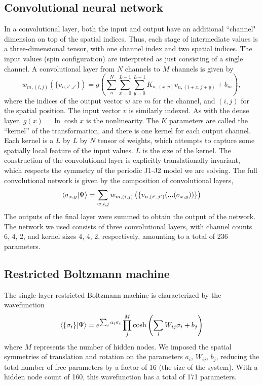 \documentclass[amsmath,amssymb,aps,prb,superscriptaddress,onecolumn,floatfix]{revtex4}
\begin{document}
\subsection{Convolutional neural network}
In a convolutional layer, both the input and output have an additional ``channel" dimension on top of the spatial indices.
Thus, each stage of intermediate values is a three-dimensional tensor, with one channel index and two spatial indices.
The input values (spin configuration) are interpreted as just consisting of a single channel.
A convolutional layer from $N$ channels to $M$ channels is given by
\begin{equation}
    w_{m,(i,j)}(\{v_{n,i',j'}\}) = g\left(\sum_{n}^N \sum_{x=0}^{L-1} \sum_{y=0}^{L-1} K_{n,(x,y)} v_{n,(i+x,j+y)} + b_m\right),
\end{equation}
where the indices of the output vector $w$ are $m$ for the channel, and $(i, j)$ for the spatial position.
The input vector $v$ is similarly indexed.
As with the dense layer, $g(x) = \ln{\cosh{x}}$ is the nonlinearity.
The $K$ parameters are called the ``kernel'' of the transformation, and there is one kernel for each output channel.
Each kernel is a $L$ by $L$ by $N$ tensor of weights, which attempts to capture some spatially local feature of the input values.
$L$ is the size of the kernel.
The construction of the convolutional layer is explicitly translationally invariant, which respects the symmetry of the periodic J1-J2 model we are solving.
The full convolutional network is given by the composition of convolutional layers,
\begin{equation}
    \bra{\sigma_{x, y}}\ket{\Psi} = \sum_{w,i,j} w_{m,(i,j)}\left(\{v_{n,(i',j')}(...(\sigma_{x,y}))\}\right)
\end{equation}
The outputs of the final layer were summed to obtain the output of the network.
The network we used consists of three convolutional layers, with channel counts 6, 4, 2, and kernel sizes 4, 4, 2, respectively, amounting to a total of 236 parameters.

\subsection{Restricted Boltzmann machine}
The single-layer restricted Boltzmann machine is characterized by the wavefunction
\begin{equation}
    \bra{\{ \sigma_i \}}\ket{\Psi} = e^{\sum_i a_i \sigma_i} \prod_j^M \cosh \left(\sum_i W_{ij} \sigma_i + b_j \right)
\end{equation}
where $M$ represents the number of hidden nodes.
We imposed the spatial symmetries of translation and rotation on the parameters $a_i$, $W_{ij}$, $b_j$, reducing the total number of free parameters by a factor of 16 (the size of the system).
With a hidden node count of 160, this wavefunction has a total of 171 parameters.
\end{document}
